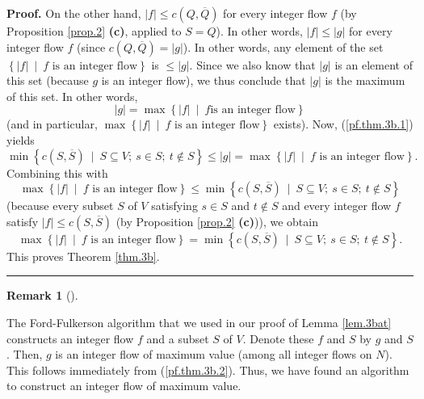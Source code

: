 \documentclass[numbers=enddot,12pt,final,onecolumn,notitlepage]{scrartcl}%
\theoremstyle{definition}
\newtheorem{remk}[theo]{Remark}
\newenvironment{remark}[1][]
{\begin{remk}[#1]\begin{leftbar}}
{\end{leftbar}\end{remk}}
\newenvironment{proof}[1][Proof]{\noindent\textbf{#1.} }{\ \rule{0.5em}{0.5em}}
\begin{document}
\begin{proof}
On the other hand, $\left\vert f\right\vert \leq c\left(  Q,\overline
{Q}\right)  $ for every integer flow $f$ (by Proposition \ref{prop.2}
\textbf{(c)}, applied to $S=Q$). In other words, $\left\vert f\right\vert
\leq\left\vert g\right\vert $ for every integer flow $f$ (since $c\left(
Q,\overline{Q}\right)  =\left\vert g\right\vert $). In other words, any
element of the set $\left\{  \left\vert f\right\vert \ \mid\ f\text{ is an
integer flow}\right\}  $ is $\leq\left\vert g\right\vert $. Since we also know
that $\left\vert g\right\vert $ is an element of this set (because $g$ is an
integer flow), we thus conclude that $\left\vert g\right\vert $ is the maximum
of this set. In other words,%
\begin{equation}
\left\vert g\right\vert =\max\left\{  \left\vert f\right\vert \ \mid\ f\text{
is an integer flow}\right\}  \label{pf.thm.3b.2}%
\end{equation}
(and in particular, $\max\left\{  \left\vert f\right\vert \ \mid\ f\text{ is
an integer flow}\right\}  $ exists). Now, (\ref{pf.thm.3b.1}) yields%
\[
\min\left\{  c\left(  S,\overline{S}\right)  \ \mid\ S\subseteq V;\ s\in
S;\ t\notin S\right\}  \leq\left\vert g\right\vert =\max\left\{  \left\vert
f\right\vert \ \mid\ f\text{ is an integer flow}\right\}  .
\]
Combining this with%
\[
\max\left\{  \left\vert f\right\vert \ \mid\ f\text{ is an integer
flow}\right\}  \leq\min\left\{  c\left(  S,\overline{S}\right)  \ \mid
\ S\subseteq V;\ s\in S;\ t\notin S\right\}
\]
(because every subset $S$ of $V$ satisfying $s\in S$ and $t\notin S$ and every
integer flow $f$ satisfy $\left\vert f\right\vert \leq c\left(  S,\overline
{S}\right)  $ (by Proposition \ref{prop.2} \textbf{(c)})), we obtain%
\[
\max\left\{  \left\vert f\right\vert \ \mid\ f\text{ is an integer
flow}\right\}  =\min\left\{  c\left(  S,\overline{S}\right)  \ \mid
\ S\subseteq V;\ s\in S;\ t\notin S\right\}  .
\]
This proves Theorem \ref{thm.3b}.
\end{proof}

\begin{remark}
\label{rmk.3balg}The Ford-Fulkerson algorithm that we used in our proof of
Lemma \ref{lem.3bat} constructs an integer flow $f$ and a subset $S$ of $V$.
Denote these $f$ and $S$ by $g$ and $S$. Then, $g$ is an integer flow of
maximum value (among all integer flows on $N$). This follows immediately from
(\ref{pf.thm.3b.2}). Thus, we have found an algorithm to construct an integer
flow of maximum value.
\end{remark}
\end{document}
